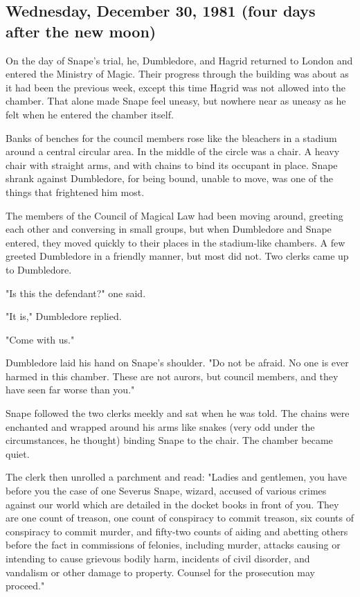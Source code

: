 \subsection{Wednesday, December 30, 1981 (four days after the new moon)}

On the day of Snape's trial, he, Dumbledore, and Hagrid returned to London and entered the Ministry of Magic. Their progress through the building was about as it had been the previous week, except this time Hagrid was not allowed into the chamber. That alone made Snape feel uneasy, but nowhere near as uneasy as he felt when he entered the chamber itself.

Banks of benches for the council members rose like the bleachers in a stadium around a central circular area. In the middle of the circle was a chair. A heavy chair with straight arms, and with chains to bind its occupant in place. Snape shrank against Dumbledore, for being bound, unable to move, was one of the things that frightened him most.

The members of the Council of Magical Law had been moving around, greeting each other and conversing in small groups, but when Dumbledore and Snape entered, they moved quickly to their places in the stadium-like chambers. A few greeted Dumbledore in a friendly manner, but most did not. Two clerks came up to Dumbledore.

"Is this the defendant?" one said.

"It is," Dumbledore replied.

"Come with us."

Dumbledore laid his hand on Snape's shoulder. "Do not be afraid. No one is ever harmed in this chamber. These are not aurors, but council members, and they have seen far worse than you."

Snape followed the two clerks meekly and sat when he was told. The chains were enchanted and wrapped around his arms like snakes (very odd under the circumstances, he thought) binding Snape to the chair. The chamber became quiet.

The clerk then unrolled a parchment and read: "Ladies and gentlemen, you have before you the case of one Severus Snape, wizard, accused of various crimes against our world which are detailed in the docket books in front of you. They are one count of treason, one count of conspiracy to commit treason, six counts of conspiracy to commit murder, and fifty-two counts of aiding and abetting others before the fact in commissions of felonies, including murder, attacks causing or intending to cause grievous bodily harm, incidents of civil disorder, and vandalism or other damage to property. Counsel for the prosecution may proceed."

